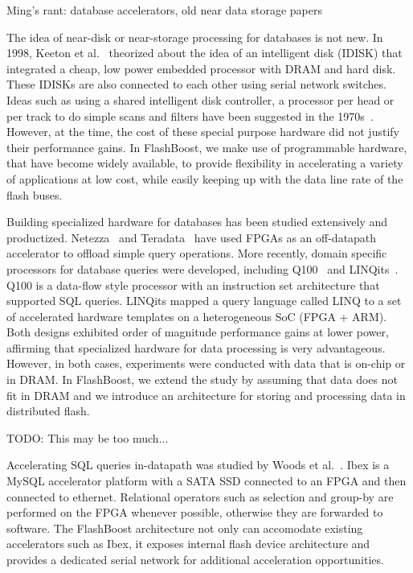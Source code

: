 Ming's rant: database accelerators, old near data storage papers

The idea of near-disk or near-storage processing for databases is not new. In
1998, Keeton et al.~\cite{?} theorized about the idea of an intelligent disk
(IDISK) that integrated a cheap, low power embedded processor with DRAM and
hard disk.  These IDISKs are also connected to each other using serial network
switches.  Ideas such as using a shared intelligent disk controller, a
processor per head or per track to do simple scans and filters have been
suggested in the 1970s~\cite{?,?,?}.  However, at the time, the cost of these
special purpose hardware did not justify their performance gains. In
FlashBoost, we make use of programmable hardware, that have become widely
available, to provide flexibility in accelerating a variety of applications at
low cost, while easily keeping up with the data line rate of the flash buses. 

Building specialized hardware for databases has been studied extensively and
productized. Netezza~\cite{?} and Teradata~\cite{?} have used FPGAs as an
off-datapath accelerator to offload simple query operations. More recently,
domain specific processors for database queries were developed, including
Q100~\cite{?} and LINQits~\cite{?}. Q100 is a data-flow style processor with an
instruction set architecture that supported SQL queries. LINQits mapped a query
language called LINQ to a set of accelerated hardware templates on a
heterogeneous SoC (FPGA + ARM). Both designs exhibited order of magnitude
performance gains at lower power, affirming that specialized hardware for data
processing is very advantageous. However, in both cases, experiments were
conducted with data that is on-chip or in DRAM. In FlashBoost, we extend the
study by assuming that data does not fit in DRAM and we introduce an
architecture for storing and processing data in distributed flash. 

TODO: This may be too much... 

Accelerating SQL queries in-datapath was studied by Woods et al.~\cite{?}.
Ibex is a MySQL accelerator platform with a SATA SSD connected to an FPGA and
then connected to ethernet. Relational operators such as selection and group-by
are performed on the FPGA whenever possible, otherwise they are forwarded to
software. The FlashBoost architecture not only can accomodate existing
accelerators such as Ibex, it exposes internal flash device architecture and
provides a dedicated serial network for additional acceleration opportunities. 



